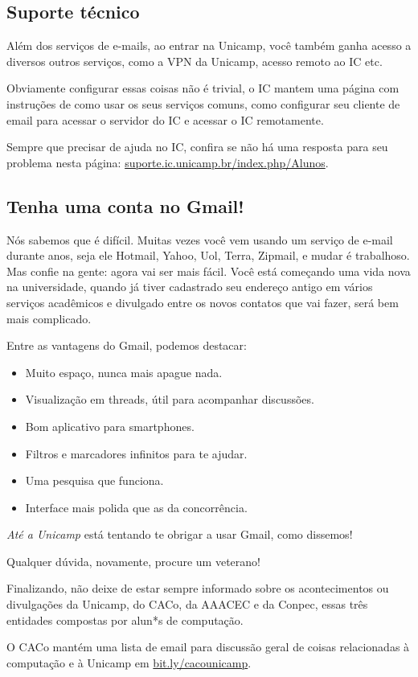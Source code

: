 \subsection{Suporte técnico}

Além dos serviços de e-mails, ao entrar na Unicamp, você também ganha acesso a
diversos outros serviços, como a VPN da Unicamp, acesso remoto ao IC etc.

Obviamente configurar essas coisas não é trivial, o IC mantem uma página com
instruções de como usar os seus serviços comuns, como configurar seu cliente de
email para acessar o servidor do IC e acessar o IC remotamente.

Sempre que precisar de ajuda no IC, confira se não há uma resposta para seu
problema nesta página: \url{suporte.ic.unicamp.br/index.php/Alunos}.


\subsection{Tenha uma conta no Gmail!}

Nós sabemos que é difícil. Muitas vezes você vem usando um serviço de e-mail
durante anos, seja ele Hotmail, Yahoo, Uol, Terra, Zipmail, e mudar é
trabalhoso.  Mas confie na gente: agora vai ser mais fácil. Você está começando
uma vida nova na universidade, quando já tiver cadastrado seu endereço antigo em
vários serviços acadêmicos e divulgado entre os novos contatos que vai fazer,
será bem mais complicado.

Entre as vantagens do Gmail, podemos destacar:

\begin{itemize}
    \item Muito espaço, nunca mais apague nada.
    \item Visualização em threads, útil para acompanhar discussões.
    \item Bom aplicativo para smartphones.
    \item Filtros e marcadores infinitos para te ajudar.
    \item Uma pesquisa que funciona.
    \item Interface mais polida que as da concorrência.
\end{itemize}

\emph{Até a Unicamp} está tentando te obrigar a usar Gmail, como dissemos!
\shrug

Qualquer dúvida, novamente, procure um veterano!

Finalizando, não deixe de estar sempre informado sobre os acontecimentos ou
divulgações da Unicamp, do CACo, da AAACEC e da Conpec, essas três entidades
compostas por alun*s de computação.

O CACo mantém uma lista de email para discussão geral de coisas relacionadas à
computação e à Unicamp em
\url{bit.ly/cacounicamp}.


